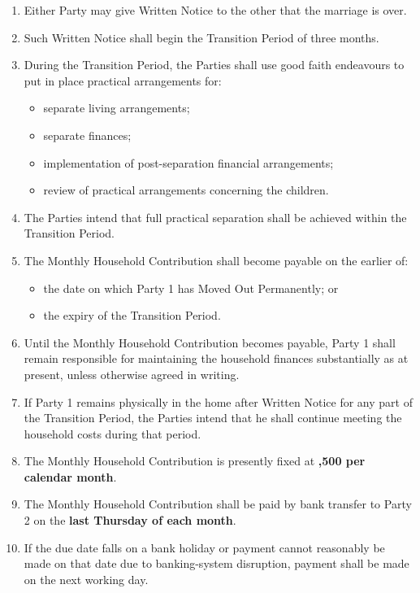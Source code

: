 \documentclass[10pt,a4paper]{article}
\begin{document}
\begin{enumerate}[label=\arabic*., start=27, leftmargin=1.8em]
    \item Either Party may give Written Notice to the other that the marriage is over.
    \item Such Written Notice shall begin the Transition Period of three months.
    \item During the Transition Period, the Parties shall use good faith endeavours to put in place practical arrangements for:
    \begin{itemize}[leftmargin=1.8em]
        \item separate living arrangements;
        \item separate finances;
        \item implementation of post-separation financial arrangements;
        \item review of practical arrangements concerning the children.
    \end{itemize}
    \item The Parties intend that full practical separation shall be achieved within the Transition Period.
    \item The Monthly Household Contribution shall become payable on the earlier of:
    \begin{itemize}[leftmargin=1.8em]
        \item the date on which Party 1 has Moved Out Permanently; or
        \item the expiry of the Transition Period.
    \end{itemize}
    \item Until the Monthly Household Contribution becomes payable, Party 1 shall remain responsible for maintaining the household finances substantially as at present, unless otherwise agreed in writing.
    \item If Party 1 remains physically in the home after Written Notice for any part of the Transition Period, the Parties intend that he shall continue meeting the household costs during that period.
    \item The Monthly Household Contribution is presently fixed at \textbf{,500 per calendar month}.
    \item The Monthly Household Contribution shall be paid by bank transfer to Party 2 on the \textbf{last Thursday of each month}.
    \item If the due date falls on a bank holiday or payment cannot reasonably be made on that date due to banking-system disruption, payment shall be made on the next working day.

\end{enumerate}
\end{document}

